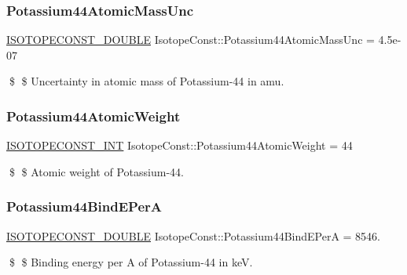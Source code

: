 \subsubsection{\texorpdfstring{Potassium44\+Atomic\+Mass\+Unc}{Potassium44AtomicMassUnc}}
{\footnotesize\ttfamily \mbox{\hyperlink{group___isotope_const-_macros_ga8f45a7272ce02c0b4c65c44636ed719a}{I\+S\+O\+T\+O\+P\+E\+C\+O\+N\+S\+T\+\_\+\+D\+O\+U\+B\+LE}} Isotope\+Const\+::\+Potassium44\+Atomic\+Mass\+Unc = 4.\+5e-\/07}

\$ \$ Uncertainty in atomic mass of Potassium-\/44 in amu. \mbox{\label{group___isotope_const-_potassium-_k44_gae02cb6540f2cc47f630a4f35b2a1cd08}} 
\subsubsection{\texorpdfstring{Potassium44\+Atomic\+Weight}{Potassium44AtomicWeight}}
{\footnotesize\ttfamily \mbox{\hyperlink{group___isotope_const-_macros_ga5f18360b3e99483a35c32d789e62621c}{I\+S\+O\+T\+O\+P\+E\+C\+O\+N\+S\+T\+\_\+\+I\+NT}} Isotope\+Const\+::\+Potassium44\+Atomic\+Weight = 44}

\$ \$ Atomic weight of Potassium-\/44. \mbox{\label{group___isotope_const-_potassium-_k44_ga17eb434611c43b0c0f0e56b445ae9777}} 
\subsubsection{\texorpdfstring{Potassium44\+Bind\+E\+PerA}{Potassium44BindEPerA}}
{\footnotesize\ttfamily \mbox{\hyperlink{group___isotope_const-_macros_ga8f45a7272ce02c0b4c65c44636ed719a}{I\+S\+O\+T\+O\+P\+E\+C\+O\+N\+S\+T\+\_\+\+D\+O\+U\+B\+LE}} Isotope\+Const\+::\+Potassium44\+Bind\+E\+PerA = 8546.}

\$ \$ Binding energy per A of Potassium-\/44 in keV. \mbox{\label{group___isotope_const-_potassium-_k44_ga104ca072cc5fda037572dcd24ad0b3a4}} 

